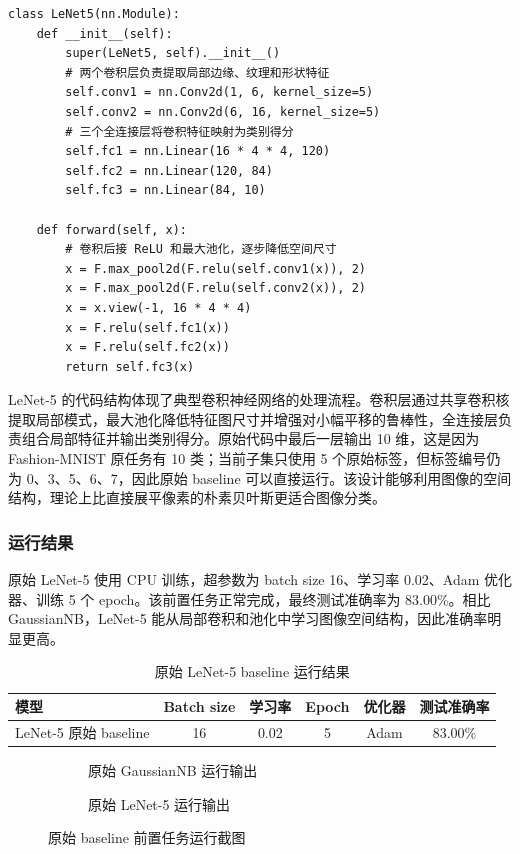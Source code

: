 \documentclass[UTF8]{ctexart}
\begin{document}
\begin{lstlisting}[caption={原始 LeNet-5 网络结构}]
class LeNet5(nn.Module):
    def __init__(self):
        super(LeNet5, self).__init__()
        # 两个卷积层负责提取局部边缘、纹理和形状特征
        self.conv1 = nn.Conv2d(1, 6, kernel_size=5)
        self.conv2 = nn.Conv2d(6, 16, kernel_size=5)
        # 三个全连接层将卷积特征映射为类别得分
        self.fc1 = nn.Linear(16 * 4 * 4, 120)
        self.fc2 = nn.Linear(120, 84)
        self.fc3 = nn.Linear(84, 10)

    def forward(self, x):
        # 卷积后接 ReLU 和最大池化，逐步降低空间尺寸
        x = F.max_pool2d(F.relu(self.conv1(x)), 2)
        x = F.max_pool2d(F.relu(self.conv2(x)), 2)
        x = x.view(-1, 16 * 4 * 4)
        x = F.relu(self.fc1(x))
        x = F.relu(self.fc2(x))
        return self.fc3(x)
\end{lstlisting}

LeNet-5 的代码结构体现了典型卷积神经网络的处理流程。卷积层通过共享卷积核提取局部模式，最大池化降低特征图尺寸并增强对小幅平移的鲁棒性，全连接层负责组合局部特征并输出类别得分。原始代码中最后一层输出 10 维，这是因为 Fashion-MNIST 原任务有 10 类；当前子集只使用 5 个原始标签，但标签编号仍为 0、3、5、6、7，因此原始 baseline 可以直接运行。该设计能够利用图像的空间结构，理论上比直接展平像素的朴素贝叶斯更适合图像分类。

\subsubsection{运行结果}

原始 LeNet-5 使用 CPU 训练，超参数为 batch size 16、学习率 0.02、Adam 优化器、训练 5 个 epoch。该前置任务正常完成，最终测试准确率为 83.00\%。相比 GaussianNB，LeNet-5 能从局部卷积和池化中学习图像空间结构，因此准确率明显更高。

\begin{table}[H]
\centering
\caption{原始 LeNet-5 baseline 运行结果}
\begin{tabular}{lccccc}
\toprule
模型 & Batch size & 学习率 & Epoch & 优化器 & 测试准确率\\
\midrule
LeNet-5 原始 baseline & 16 & 0.02 & 5 & Adam & 83.00\%\\
\bottomrule
\end{tabular}
\end{table}

\begin{figure}[H]
\centering
\begin{subfigure}{0.48\textwidth}
  \centering
  \caption{原始 GaussianNB 运行输出}
\end{subfigure}
\begin{subfigure}{0.48\textwidth}
  \centering
  \caption{原始 LeNet-5 运行输出}
\end{subfigure}
\caption{原始 baseline 前置任务运行截图}
\end{figure}
\end{document}
